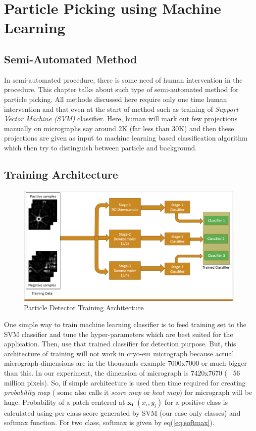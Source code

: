 \documentclass[twoside]{iitbreport}
\begin{document}
\chapter{Particle Picking using Machine Learning}
\section{Semi-Automated Method}
In semi-automated procedure, there is some need of human intervention in the procedure. This chapter talks about such type of semi-automated method for particle picking. All methods discussed here require only one time human intervention and that even at the start of method such as training of \textit{Support Vector Machine (SVM)} classifier. Here, human will mark out few projections manually on micrographs say around 2K (far less than 30K) and then these projections are given as input to machine learning based classification algorithm which then try to distinguish between particle and background.


\section{Training Architecture}\label{sec:train_arch}

\begin{figure}[H]
\includegraphics[width=1\textwidth]{train_arch}
\centering
\captionsetup{justification=centering}
\caption{Particle Detector Training Architecture}
\label{fig:training_arch}
\end{figure}

One simple way to train machine learning classifier is to feed training set to the SVM classifier and tune the hyper-parameters which are best suited for the application. Then, use that trained classifier for detection purpose. But, this architecture of training will not work in cryo-em  micrograph because actual micrograph dimensions are in the thousands example 7000x7000 or much bigger than this. In our experiment, the dimension of micrograph is 7420x7670 (~ 56 million pixels). So, if simple architecture is used then time required for creating \textit{probability map} ( some also calls it \textit{score map} or \textit{heat map}) for micrograph will be huge. Probability of a patch centered at $\boldsymbol{x_i}$ $(x_i,y_i)$ for a positive class is calculated using per class score generated by SVM  (our case only classes) and softmax function. For two class, softmax is given by eq(\ref{eq:softmax}).
\end{document}
